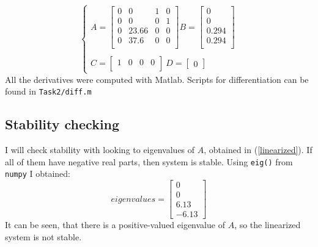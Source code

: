 \documentclass[a4paper,12pt]{article}
\begin{document}
    \begin{equation}\label{linearized}
        \begin{cases}
            A=
            \begin{bmatrix}
                0 & 0 & 1 & 0 \\
                0 & 0 & 0 & 1 \\
                0 & 23.66 & 0 & 0\\
                0 & 37.6  & 0 & 0\\
            \end{bmatrix}
            B=
            \begin{bmatrix}
                0 \\
                0 \\
                0.294 \\
                0.294 \\
            \end{bmatrix}\\
            \\
            C=
            \begin{bmatrix}
                1 & 0 & 0 & 0\\
            \end{bmatrix}\ 
            D=
            \begin{bmatrix}
                0
            \end{bmatrix}
        \end{cases}
    \end{equation}
    All the derivatives were computed with Matlab.
    Scripts for differentiation can be found in \texttt{Task2/diff.m}
    \subsection{Stability checking}\label{eigenvals}
    I will check stability with looking to eigenvalues of $A$, obtained in 
    (\ref{linearized}). If all of them have negative real parts, then system is 
    stable. Using \texttt{eig()} from \texttt{numpy} I obtained:
    \begin{equation*}
        eigenvalues = 
        \begin{bmatrix}
            0\\
            0\\
            6.13\\
            -6.13
        \end{bmatrix}
    \end{equation*}
    It can be seen, that there is a positive-valued eigenvalue of $A$, so the 
    linearized system is not stable.
\end{document}
